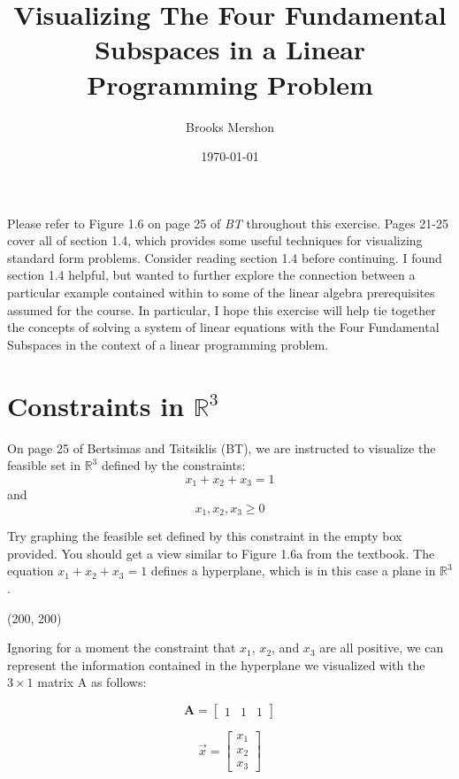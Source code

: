 \documentclass[11pt]{article}
\theoremstyle{plain} %
\theoremstyle{definition}
\theoremstyle{remark}
\begin{document}
\title{Visualizing The Four Fundamental Subspaces in a Linear Programming Problem}
\author{Brooks Mershon}
\date{\today}
\maketitle
Please refer to Figure 1.6 on page 25 of \textit{BT} throughout this exercise. Pages 21-25 cover all of section 1.4, which provides some useful techniques for visualizing standard form  problems. Consider reading section 1.4 before continuing. I found section 1.4 helpful, but wanted to further explore the connection between a particular example contained within to some of the linear algebra prerequisites assumed for the course. In particular, I hope this exercise will help tie together the concepts of solving a system of linear equations with the Four Fundamental Subspaces in the context of a linear programming problem.

\bigskip

\section{Constraints in $\mathbb{R}^3$}
On page 25 of Bertsimas and Tsitsiklis (BT), we are instructed to visualize the feasible set in $\mathbb{R}^3$ defined by the constraints:
$$x_1 + x_2 + x_3 = 1 $$
and
$$x_1, x_2, x_3 \ge 0 $$

Try graphing the feasible set defined by this constraint in the empty box provided. You should get a view similar to Figure 1.6a from the textbook. The equation $x_1 + x_2 + x_3 = 1 $ defines a hyperplane, which is in this case a plane in $\mathbb{R}^3$.

\begin{center}\framebox(200, 200){}\end{center}

Ignoring for a moment the constraint that $x_1$, $x_2$, and $x_3$ are all positive, we can represent the information contained in the hyperplane we visualized with the $3\times 1$ matrix A as follows:

\[
\mathbf{A}=
  \begin{bmatrix}
    1 & 1 & 1
  \end{bmatrix}
\]

\[
\vec{x}=
  \begin{bmatrix}
    x_1 \\
    x_2 \\
    x_3
  \end{bmatrix}
\]
\end{document}
